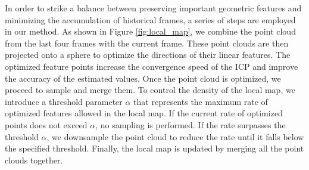 In order to strike a balance between preserving important geometric features and minimizing the accumulation of historical frames, a series of steps are employed in our method. As shown in Figure \ref{fig:local_map}, we combine the point cloud from the last four frames with the current frame. These point clouds are then projected onto a sphere to optimize the directions of their linear features. The optimized feature points increase the convergence speed of the ICP and improve the accuracy of the estimated values. Once the point cloud is optimized, we proceed to sample and merge them. To control the density of the local map, we introduce a threshold parameter $\alpha$ that represents the maximum rate of optimized features allowed in the local map. If the current rate of optimized points does not exceed $\alpha$, no sampling is performed. If the rate surpasses the threshold $\alpha$, we downsample the point cloud to reduce the rate until it falls below the specified threshold. Finally, the local map is updated by merging all the point clouds together.